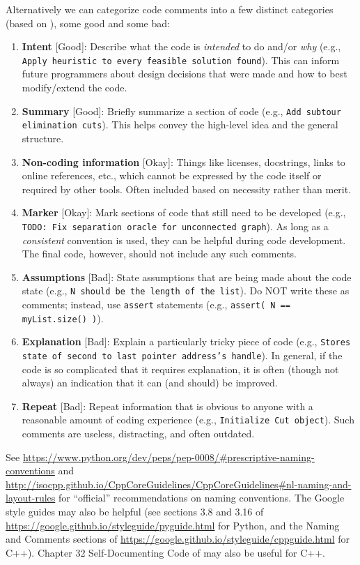 \documentclass[12pt]{article}
\begin{document}
Alternatively we can categorize code comments into a few distinct categories (based on \cite{codecomplete2}), some good and some bad:
\begin{enumerate}
    \item \textbf{Intent} [Good]: Describe what the code is \emph{intended} to do and/or \emph{why} (e.g., \texttt{Apply heuristic to every feasible solution found}). This can inform future programmers about design decisions that were made and how to best modify/extend the code.
    \item \textbf{Summary} [Good]: Briefly summarize a section of code (e.g., \texttt{Add subtour elimination cuts}). This helps convey the high-level idea and the general structure.
    \item \textbf{Non-coding information} [Okay]: Things like licenses, docstrings, links to online references, etc., which cannot be expressed by the code itself or required by other tools. Often included based on necessity rather than merit.
    \item \textbf{Marker} [Okay]: Mark sections of code that still need to be developed (e.g., \texttt{TODO: Fix separation oracle for unconnected graph}). As long as a \emph{consistent} convention is used, they can be helpful during code development. The final code, however, should not include any such comments.
    \item \textbf{Assumptions} [Bad]: State assumptions that are being made about the code state (e.g., \texttt{N should be the length of the list}). Do NOT write these as comments; instead, use \texttt{assert} statements (e.g., \texttt{assert( N == myList.size() )}).
    \item \textbf{Explanation} [Bad]: Explain a particularly tricky piece of code (e.g., \texttt{Stores state of second to last pointer address's handle}). In general, if the code is so complicated that it requires explanation, it is often (though not always) an indication that it can (and should) be improved.
    \item \textbf{Repeat} [Bad]: Repeat information that is obvious to anyone with a reasonable amount of coding experience (e.g., \texttt{Initialize Cut object}). Such comments are useless, distracting, and often outdated.
\end{enumerate}
See \url{https://www.python.org/dev/peps/pep-0008/#prescriptive-naming-conventions} and \url{http://isocpp.github.io/CppCoreGuidelines/CppCoreGuidelines#nl-naming-and-layout-rules} for ``official'' recommendations on naming conventions. The Google style guides may also be helpful (see sections 3.8 and 3.16 of \url{https://google.github.io/styleguide/pyguide.html} for Python, and the Naming and Comments sections of \url{https://google.github.io/styleguide/cppguide.html} for C++). Chapter 32 Self-Documenting Code of \cite{codecomplete2} may also be useful for C++.
\end{document}
